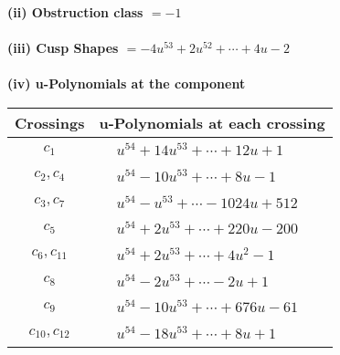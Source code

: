 \documentclass[1p]{elsarticle_modified}
\theoremstyle{definition}
\begin{document}
\flushleft \textbf{(ii) Obstruction class $= -1$}\\~\\
\flushleft \textbf{(iii) Cusp Shapes $= -4 u^{53}+2 u^{52}+\cdots+4 u-2$}\\~\\
\newpage\renewcommand{\arraystretch}{1}
\flushleft \textbf{(iv) u-Polynomials at the component}\newline \\
\begin{tabular}{m{50pt}|m{274pt}}
Crossings & \hspace{64pt}u-Polynomials at each crossing \\
\hline $$\begin{aligned}c_{1}\end{aligned}$$&$\begin{aligned}
&u^{54}+14 u^{53}+\cdots+12 u+1
\end{aligned}$\\
\hline $$\begin{aligned}c_{2},c_{4}\end{aligned}$$&$\begin{aligned}
&u^{54}-10 u^{53}+\cdots+8 u-1
\end{aligned}$\\
\hline $$\begin{aligned}c_{3},c_{7}\end{aligned}$$&$\begin{aligned}
&u^{54}- u^{53}+\cdots-1024 u+512
\end{aligned}$\\
\hline $$\begin{aligned}c_{5}\end{aligned}$$&$\begin{aligned}
&u^{54}+2 u^{53}+\cdots+220 u-200
\end{aligned}$\\
\hline $$\begin{aligned}c_{6},c_{11}\end{aligned}$$&$\begin{aligned}
&u^{54}+2 u^{53}+\cdots+4 u^2-1
\end{aligned}$\\
\hline $$\begin{aligned}c_{8}\end{aligned}$$&$\begin{aligned}
&u^{54}-2 u^{53}+\cdots-2 u+1
\end{aligned}$\\
\hline $$\begin{aligned}c_{9}\end{aligned}$$&$\begin{aligned}
&u^{54}-10 u^{53}+\cdots+676 u-61
\end{aligned}$\\
\hline $$\begin{aligned}c_{10},c_{12}\end{aligned}$$&$\begin{aligned}
&u^{54}-18 u^{53}+\cdots+8 u+1
\end{aligned}$\\
\hline
\end{tabular}\\~\\
\end{document}
